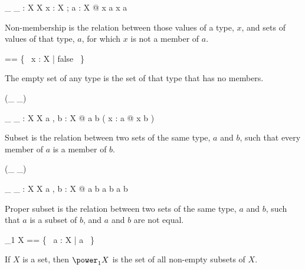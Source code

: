 \documentclass[draft,a4paper,10pt,wd]{isov2}
\begin{document}
\begin{gendef}[X]
\_ \notin \_ : X \rel \power X
\where
\forall x : X ; a : \power X @ x \notin a \iff \lnot x \in a
\end{gendef}

Non-membership is the relation between those values of a type, $x$,
and sets of values of that type, $a$,
for which $x$ is not a member of $a$.


\begin{zed}
\emptyset [ X ] == \{~ x : X | false ~\}
\end{zed}

The empty set of any type is the set of that
type that has no members.


\begin{zed}
\relation (\_ \subseteq \_)
\end{zed}

\begin{gendef}[X]
\_ \subseteq \_ : \power X \rel \power X
\where
\forall a , b : \power X @ a \subseteq b \iff
( \forall x : a @ x \in b )
\end{gendef}

Subset is the relation between two sets of the same type, $a$ and $b$,
such that every member of $a$ is a member of $b$.


\begin{zed}
\relation (\_ \subset \_)
\end{zed}

\begin{gendef}[X]
\_ \subset \_ : \power X \rel \power X
\where
\forall a , b : \power X @ a \subset b \iff
a \subseteq b \land a \neq b
\end{gendef}

Proper subset is the relation between two
sets of the same type, $a$ and $b$,
such that $a$ is a subset of $b$,
and $a$ and $b$ are not equal.


\begin{zed}
\power_1 X == \{~ a : \power X | a \neq \emptyset ~\}
\end{zed}

If $X$ is a set, then $\power_1 X$ is the set of all non-empty subsets of $X$.
\end{document}
